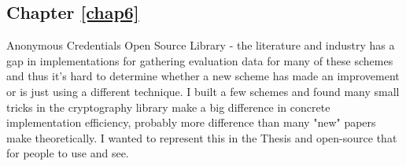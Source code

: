 \subsection{Chapter \ref{chap6}}
Anonymous Credentials Open Source Library - the literature and industry has a gap in implementations for gathering evaluation data for many of these schemes and thus it's hard to determine whether a new scheme has made an improvement or is just using a different technique. I built a few schemes and found many small tricks in the cryptography library make a big difference in concrete implementation efficiency, probably more difference than many "new" papers make theoretically. I wanted to represent this in the Thesis and open-source that for people to use and see.








